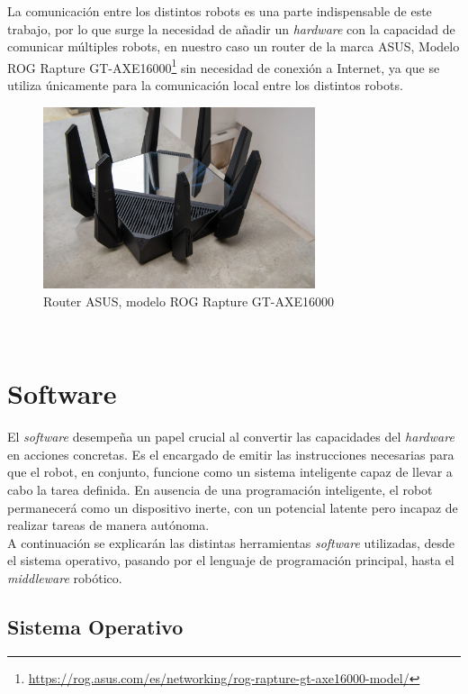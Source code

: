 La comunicación entre los distintos robots es una parte indispensable de este
trabajo, por lo que surge la necesidad de añadir un \textit{hardware} con la
capacidad de comunicar múltiples robots, en nuestro caso un router de la marca
ASUS, Modelo ROG Rapture
GT-AXE16000\footnote{\url{https://rog.asus.com/es/networking/rog-rapture-gt-axe16000-model/}}
sin necesidad de conexión a Internet, ya que se utiliza únicamente para la
comunicación local entre los distintos robots.
\\

\begin{figure} [h!]
  \begin{center}
    \includegraphics[width=8cm]{figs/asus_router}
  \end{center}
  \caption{Router ASUS, modelo ROG Rapture GT-AXE16000 \cite{asus_router}}
  \label{fig:asus_router}
\end{figure}\


\section{Software}
\label{sec:software}

El \textit{software} desempeña un papel crucial al convertir las capacidades del
\textit{hardware} en acciones concretas.
Es el encargado de emitir las instrucciones necesarias para que el robot, en
conjunto, funcione como un sistema inteligente capaz de llevar a cabo la tarea
definida.
En ausencia de una programación inteligente, el robot permanecerá como un
dispositivo inerte, con un potencial latente pero incapaz de realizar tareas de
manera autónoma.
\\

A continuación se explicarán las distintas herramientas \textit{software}
utilizadas, desde el sistema operativo, pasando por el lenguaje de programación
principal, hasta el \textit{middleware} robótico.
\\


\subsection{Sistema Operativo}
\label{sec:sistema_operativo}

